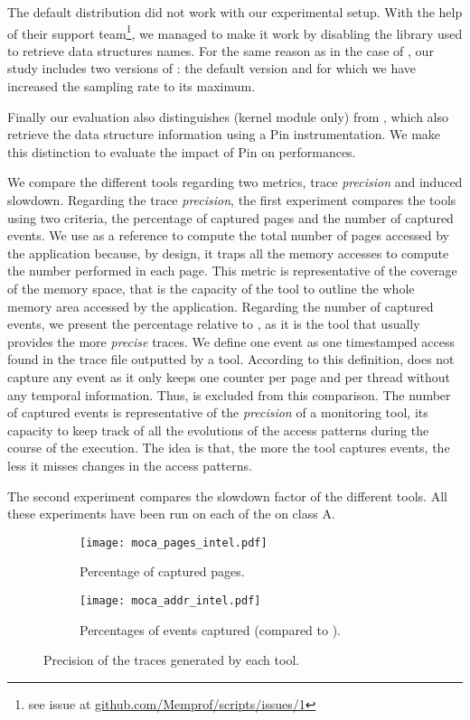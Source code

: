 The default \MemProf distribution did not work with our experimental setup. With the help
of their support team\footnote{see issue at
    \href{https://github.com/Memprof/scripts/issues/1}{github.com/Memprof/scripts/issues/1}}, we managed to make it work by disabling the library used to retrieve
data structures names. For the same reason as in the case of \Mitos, our study includes
two versions of \MemProf: the default version and \MemProfTun for which we have
increased the sampling rate to its maximum.

Finally our evaluation also distinguishes \Moca (kernel module only) from
\MocaPin, which also retrieve the data structure information using a Pin
instrumentation. We make this distinction to evaluate the impact of Pin on
\Moca performances.

We compare the different tools regarding two metrics, trace \emph{precision} and induced slowdown. Regarding the trace \emph{precision}, the first experiment compares the tools
using two criteria, the
percentage of captured pages and the number of captured events.  We use \TABARNAC as a reference to compute the total number of pages accessed by the
application because, by design, it traps all the memory accesses to compute the number performed in each page. This metric is representative of the coverage of the
memory space, that is the capacity of the tool to outline the whole memory area accessed by the application. Regarding the number of captured events, we present the percentage
relative to \Moca, as it is the tool that usually provides the more \emph{precise} traces. We define one event as one
timestamped access found in the trace file outputted by a tool. According to this definition, \TABARNAC does not capture any event as it only keeps one
counter per page and per thread without any temporal information. Thus, \TABARNAC is excluded from this comparison. The number of captured events is representative
of the \emph{precision} of a monitoring tool, its capacity to keep track of all the evolutions of the access patterns during the course of the execution. The idea is
that, the more the tool captures events, the less it misses changes in the access patterns.

The second experiment compares the
slowdown factor of the different tools.  All these experiments have been run on each of the \NPB on class A.

\begin{figure}[htb]
    \centering
    \begin{subfigure}{\linewidth}
        \texttt{[image: moca\_pages\_intel.pdf]}
        \caption{Percentage of captured pages.}
        \label{fig:pages}
    \end{subfigure}
    \begin{subfigure}{\linewidth}
        \texttt{[image: moca\_addr\_intel.pdf]}
        \caption{Percentages of events captured (compared to \Moca).}
        \label{fig:addr}
    \end{subfigure}
    \caption{Precision of the traces generated by each tool.}
    \label{fig:pages-addr}
\end{figure}

